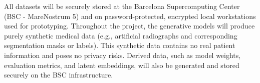 All datasets will be securely stored at the Barcelona Supercomputing Center (BSC - MareNostrum 5) 
and on password-protected, encrypted local workstations used for prototyping. Throughout the project, 
the generative models will produce purely synthetic medical data (e.g., artificial radiographs 
and corresponding segmentation masks or labels). This synthetic data contains no real patient 
information and poses no privacy risks. Derived data, such as model weights, evaluation metrics, 
and latent embeddings, will also be generated and stored securely on the BSC infrastructure. 


